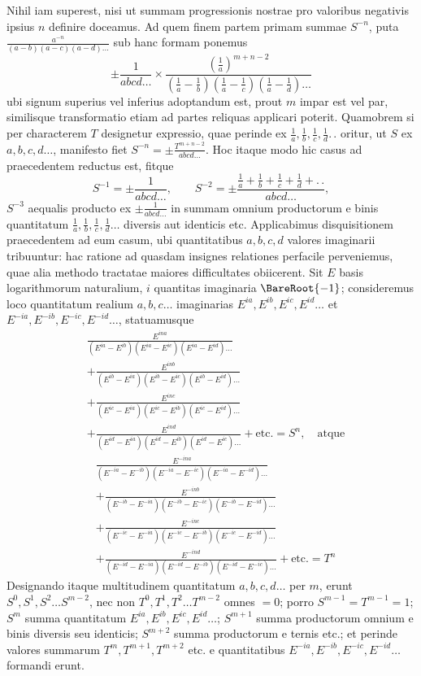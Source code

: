 Nihil iam superest, nisi ut summam progressionis nostrae pro valoribus negativis ipsius $n$ definire doceamus. Ad quem finem partem primam summae $S^{-n}$, puta $\frac{a^{-n}}{(a-b)(a-c)(a-d)\ldots}$ sub hanc formam ponemus
\[
\pm\frac1{abcd\ldots}\times\frac{(\frac1a)^{m+n-2}}{(\frac1a-\frac1b)(\frac1a-\frac1c)(\frac1a-\frac1d)\ldots}
\]
ubi signum superius vel inferius adoptandum est, prout $m$ impar est vel par, similisque transformatio etiam ad partes reliquas applicari poterit. Quamobrem si per characterem $T$ designetur expressio, quae perinde ex $\frac1a,\frac1b,\frac1c,\frac1d.\,.$ oritur, ut $S$ ex $a,b,c,d\ldots$, manifesto fiet $S^{-n}=\pm\frac{T^{m+n-2}}{abcd\ldots}$. Hoc itaque modo hic casus ad praecedentem reductus est, fitque
\[
S^{-1}=\pm\frac1{abcd\ldots},\qquad S^{-2}=\pm\frac{\frac1a+\frac1b+\frac1c+\frac1d+.\,.}{abcd\ldots},
\]
$S^{-3}$ aequalis producto ex $\pm\frac1{abcd\ldots}$ in summam omnium productorum e binis quantitatum $\frac1a,\frac1b,\frac1c,\frac1d\ldots$ diversis aut identicis etc.
Applicabimus disquisitionem praecedentem ad eum casum, ubi quantitatibus $a,b,c,d$ valores imaginarii tribuuntur: hac ratione ad quasdam insignes relationes perfacile perveniemus, quae alia methodo tractatae maiores difficultates obiicerent. Sit $E$ basis logarithmorum naturalium, $i$ quantitas imaginaria $\BareRoot{-1}$; consideremus loco quantitatum realium $a,b,c\ldots$ imaginarias $E^{ia},E^{ib},E^{ic},E^{id}\ldots$ et $E^{-ia},E^{-ib},E^{-ic},E^{-id}\ldots$, statuamusque
\[
\begin{aligned}
&\frac{E^{ina}}{(E^{ia}-E^{ib})(E^{ia}-E^{ic})(E^{ia}-E^{id})\ldots}\\
&+\frac{E^{inb}}{(E^{ib}-E^{ia})(E^{ib}-E^{ic})(E^{ib}-E^{id})\ldots}\\
&+\frac{E^{inc}}{(E^{ic}-E^{ia})(E^{ic}-E^{ib})(E^{ic}-E^{id})\ldots}\\
&+\frac{E^{ind}}{(E^{id}-E^{ia})(E^{id}-E^{ib})(E^{id}-E^{ic})\ldots}+\text{etc.}=S^n,\quad\text{atque}
\end{aligned}
\]
\[
\begin{aligned}
&\frac{E^{-ina}}{(E^{-ia}-E^{-ib})(E^{-ia}-E^{-ic})(E^{-ia}-E^{-id})\ldots}\\
&+\frac{E^{-inb}}{(E^{-ib}-E^{-ia})(E^{-ib}-E^{-ic})(E^{-ib}-E^{-id})\ldots}\\
&+\frac{E^{-inc}}{(E^{-ic}-E^{-ia})(E^{-ic}-E^{-ib})(E^{-ic}-E^{-id})\ldots}\\
&+\frac{E^{-ind}}{(E^{-id}-E^{-ia})(E^{-id}-E^{-ib})(E^{-id}-E^{-ic})\ldots}+\text{etc.}=T^n
\end{aligned}
\]
Designando itaque multitudinem quantitatum $a,b,c,d\ldots$ per $m$, erunt $S^0,S^1,S^2\ldots S^{m-2}$, nec non $T^0,T^1,T^2\ldots T^{m-2}$ omnes $=0$; porro $S^{m-1}=T^{m-1}=1$; $S^m$ summa quantitatum $E^{ia},E^{ib},E^{ic},E^{id}\ldots$; $S^{m+1}$ summa productorum omnium e binis diversis seu identicis; $S^{m+2}$ summa productorum e ternis etc.; et perinde valores summarum $T^m,T^{m+1},T^{m+2}$ etc. e quantitatibus $E^{-ia},E^{-ib},E^{-ic},E^{-id}\ldots$ formandi erunt.

